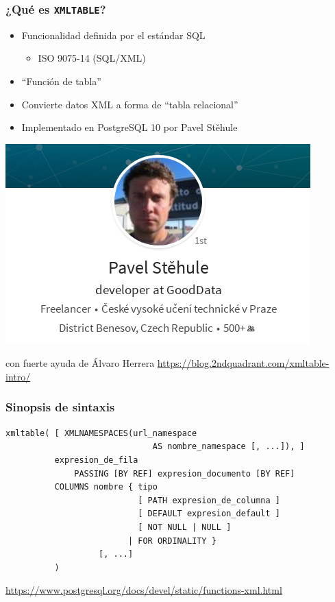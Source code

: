 \begin{frame}
	\frametitle{¿Qué es \texttt{XMLTABLE}?}
\vspace{-0.6cm}
\begin{itemize}
\item Funcionalidad definida por el estándar SQL
\begin{itemize} \item ISO 9075-14 (SQL/XML) \end{itemize}
\item ``Función de tabla''
\item Convierte datos XML a forma de ``tabla relacional''
\item<2-> Implementado en PostgreSQL 10 por Pavel Stěhule
\end{itemize}
\pause \raggedleft
\includegraphics[scale=0.25]{pavel.png}

\pause

\footnotesize
\raggedleft con fuerte ayuda de Álvaro Herrera
{\color{blue}\url{https://blog.2ndquadrant.com/xmltable-intro/}}

\end{frame}

\begin{frame}[fragile]
\frametitle{Sinopsis de sintaxis}
\vspace{-0.3cm}
\begin{lstlisting}
xmltable( [ XMLNAMESPACES(url_namespace
                              AS nombre_namespace [, ...]), ]
          expresion_de_fila
              PASSING [BY REF] expresion_documento [BY REF]
          COLUMNS nombre { tipo
                           [ PATH expresion_de_columna ]
                           [ DEFAULT expresion_default ]
                           [ NOT NULL | NULL ]
                         | FOR ORDINALITY }
                   [, ...]
          )
\end{lstlisting}
\footnotesize\color{blue}\url{https://www.postgresql.org/docs/devel/static/functions-xml.html}
\end{frame}

